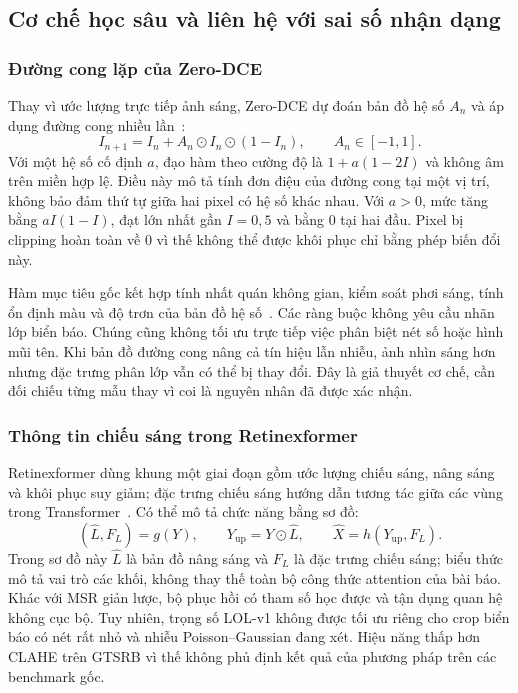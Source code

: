 \subsection{Cơ chế học sâu và liên hệ với sai số nhận dạng}
\subsubsection{Đường cong lặp của Zero-DCE}
Thay vì ước lượng trực tiếp ảnh sáng, Zero-DCE dự đoán bản đồ hệ số $A_n$ và áp dụng đường cong nhiều lần~\cite{zerodce}:
\begin{equation}
I_{n+1}=I_n+A_n\odot I_n\odot(1-I_n),\qquad A_n\in[-1,1].
\end{equation}
Với một hệ số cố định $a$, đạo hàm theo cường độ là $1+a(1-2I)$ và không âm trên miền hợp lệ. Điều này mô tả tính đơn điệu của đường cong tại một vị trí, không bảo đảm thứ tự giữa hai pixel có hệ số khác nhau. Với $a>0$, mức tăng bằng $aI(1-I)$, đạt lớn nhất gần $I=0,5$ và bằng 0 tại hai đầu. Pixel bị clipping hoàn toàn về 0 vì thế không thể được khôi phục chỉ bằng phép biến đổi này.

Hàm mục tiêu gốc kết hợp tính nhất quán không gian, kiểm soát phơi sáng, tính ổn định màu và độ trơn của bản đồ hệ số~\cite{zerodce}. Các ràng buộc không yêu cầu nhãn lớp biển báo. Chúng cũng không tối ưu trực tiếp việc phân biệt nét số hoặc hình mũi tên. Khi bản đồ đường cong nâng cả tín hiệu lẫn nhiễu, ảnh nhìn sáng hơn nhưng đặc trưng phân lớp vẫn có thể bị thay đổi. Đây là giả thuyết cơ chế, cần đối chiếu từng mẫu thay vì coi là nguyên nhân đã được xác nhận.

\subsubsection{Thông tin chiếu sáng trong Retinexformer}
Retinexformer dùng khung một giai đoạn gồm ước lượng chiếu sáng, nâng sáng và khôi phục suy giảm; đặc trưng chiếu sáng hướng dẫn tương tác giữa các vùng trong Transformer~\cite{retinexformer}. Có thể mô tả chức năng bằng sơ đồ:
\begin{equation}
(\widehat{L},F_L)=g(Y),\qquad Y_{\mathrm{up}}=Y\odot\widehat{L},\qquad
\widehat{X}=h(Y_{\mathrm{up}},F_L).
\end{equation}
Trong sơ đồ này $\widehat{L}$ là bản đồ nâng sáng và $F_L$ là đặc trưng chiếu sáng; biểu thức mô tả vai trò các khối, không thay thế toàn bộ công thức attention của bài báo. Khác với MSR giản lược, bộ phục hồi có tham số học được và tận dụng quan hệ không cục bộ. Tuy nhiên, trọng số LOL-v1 không được tối ưu riêng cho crop biển báo có nét rất nhỏ và nhiễu Poisson--Gaussian đang xét. Hiệu năng thấp hơn CLAHE trên GTSRB vì thế không phủ định kết quả của phương pháp trên các benchmark gốc.

